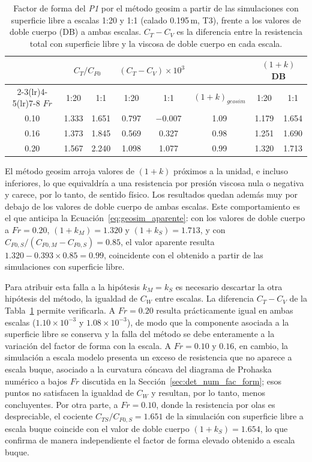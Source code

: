\begin{table}[htbp]
\centering
\caption{Factor de forma del \textit{P1} por el método geosim a partir de las
simulaciones con superficie libre a escalas 1:20 y 1:1 (calado 0.195\,m, T3),
frente a los valores de doble cuerpo (DB) a ambas escalas. $C_T - C_V$ es la
diferencia entre la resistencia total con superficie libre y la viscosa de doble
cuerpo en cada escala.}
\label{tab:geosim_P1}
\small
\begin{tabular}{cccccccc}
\toprule
 & \multicolumn{2}{c}{$C_T/C_{F0}$} & \multicolumn{2}{c}{$(C_T - C_V)\times10^{3}$}
 & & \multicolumn{2}{c}{$(1+k)$ DB} \\
\cmidrule(lr){2-3}\cmidrule(lr){4-5}\cmidrule(lr){7-8}
$Fr$ & 1:20 & 1:1 & 1:20 & 1:1 & $(1+k)_{geosim}$ & 1:20 & 1:1 \\
\midrule
0.10 & 1.333 & 1.651 & 0.797 & $-0.007$ & 1.09 & 1.179 & 1.654 \\
0.16 & 1.373 & 1.845 & 0.569 & 0.327 & 0.98 & 1.251 & 1.690 \\
0.20 & 1.567 & 2.240 & 1.098 & 1.077 & 0.99 & 1.320 & 1.713 \\
\bottomrule
\end{tabular}
\end{table}

El método geosim arroja valores de $(1+k)$ próximos a la unidad, e incluso
inferiores, lo que equivaldría a una resistencia por presión viscosa nula o
negativa y carece, por lo tanto, de sentido físico. Los resultados quedan además
muy por debajo de los valores de doble cuerpo de ambas escalas. Este
comportamiento es el que anticipa la Ecuación~\eqref{eq:geosim_aparente}: con los
valores de doble cuerpo a $Fr = 0{.}20$, $(1+k_M) = 1{.}320$ y
$(1+k_S) = 1{.}713$, y con $C_{F0,S}/(C_{F0,M} - C_{F0,S}) = 0{.}85$, el valor
aparente resulta $1{.}320 - 0{.}393 \times 0{.}85 = 0{.}99$, coincidente con el
obtenido a partir de las simulaciones con superficie libre.

Para atribuir esta falla a la hipótesis $k_M = k_S$ es necesario descartar la
otra hipótesis del método, la igualdad de $C_W$ entre escalas. La diferencia
$C_T - C_V$ de la Tabla~\ref{tab:geosim_P1} permite verificarla. A
$Fr = 0{.}20$ resulta prácticamente igual en ambas escalas
($1{.}10\times10^{-3}$ y $1{.}08\times10^{-3}$), de modo que la componente asociada
a la superficie libre se conserva y la falla del método se debe enteramente a la
variación del factor de forma con la escala. A $Fr = 0{.}10$ y $0{.}16$, en
cambio, la simulación a escala modelo presenta un exceso de resistencia que no
aparece a escala buque, asociado a la curvatura cóncava del diagrama de Prohaska
numérico a bajos $Fr$ discutida en la Sección~\ref{sec:det_num_fac_form}; esos
puntos no satisfacen la igualdad de $C_W$ y resultan, por lo tanto, menos
concluyentes. Por otra parte, a $Fr = 0{.}10$, donde la resistencia por olas es
despreciable, el cociente $C_{TS}/C_{F0,S} = 1{.}651$ de la simulación con
superficie libre a escala buque coincide con el valor de doble cuerpo
$(1+k_S) = 1{.}654$, lo que confirma de manera independiente el factor de forma
elevado obtenido a escala buque.

